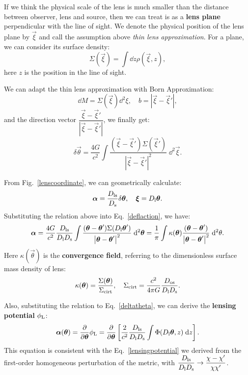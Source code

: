 If we think the physical scale of the lens is much smaller than the distance between observer, lens and source, then we can treat is as a \textbf{lens plane} perpendicular with the line of sight. We denote the physical position of the lens plane by $\vec{\xi}$ and call the assumption above \textit{thin lens approximation}. For a plane, we can consider its surface density:
\begin{equation}
    \Sigma(\vec{\xi}) = \int \dd z \rho(\vec{\xi},z),
\end{equation}
here $z$ is the position in the line of sight.

We can adapt the thin lens approximation with Born Approximation:
\[
    \dd M = \Sigma(\vec{\xi})\dd^2 \xi,\quad b = \left|\vec{\xi}-\vec{\xi}'\right|,
\]
and the direction vector $\dfrac{\vec{\xi}-\vec{\xi}'}{|\vec{\xi}-\vec{\xi}'|}$, we finally get:
\begin{equation}
    \delta \vec{\theta} = \dfrac{4G}{c^2}\int \dfrac{(\vec{\xi}-\vec{\xi}')\Sigma(\vec{\xi}')}{\left|\vec{\xi}-\vec{\xi}'\right|^2}\;\dd ^2 \vec{\xi}.
    \label{deflaction}
\end{equation}

From Fig.~\ref{lenscoordinate}, we can geometrically calculate:
\[
    \vec{\alpha} = \dfrac{D_{\rm ls}}{D_{\rm s}}\delta\vec{\theta},\quad \vec{\xi} = D_{\rm l}\vec{\theta}.
\]
Substituting the relation above into Eq.~\ref{deflaction}, we have:
\begin{equation}
    \vec{\alpha} = \dfrac{4G}{c^2}\dfrac{D_{\rm ls}}{D_{\rm l}D_{\rm s}}\int \dfrac{(\vec{\theta}-\vec{\theta}')\Sigma(D_{\rm l}\vec{\theta}')}{\left|\vec{\theta}-\vec{\theta}'\right|^2}\;\dd ^2 \vec{\theta} = \dfrac{1}{\pi}\int\kappa(\vec{\theta})\dfrac{(\vec{\theta}-\vec{\theta}')}{\left|\vec{\theta}-\vec{\theta}'\right|^2}\;\dd ^2  \theta.
\end{equation}
Here $\kappa(\vec{\theta})$ is the \textbf{convergence field}, referring to the dimensionless surface mass density of lens:
\begin{equation}
    \kappa(\vec{\theta}) = \dfrac{\Sigma(\vec{\theta})}{\Sigma_{\rm cirt}},\quad \Sigma_{\rm cirt} = \dfrac{c^2}{4\pi G}\dfrac{D_{\rm os}}{D_{\rm l}D_{\rm s}}.
\end{equation}

Also, substituting the relation to Eq.~\ref{deltatheta}, we can derive the \textbf{lensing potential} $\phi_{\rm L}$:
\begin{equation}
    \vec{\alpha}(\vec{\theta}) = \dfrac{\pp}{\pp \vec{\theta}} \phi_{\rm L} = \dfrac{\pp}{\pp \vec{\theta}}\left[ \dfrac{2}{c^2}\dfrac{D_{\rm ls}}{D_{\rm l}D_{\rm s}}\int \Phi(D_{\rm l}\vec{\theta},z)\;\dd z\right].
\end{equation}
This equation is consistent with the Eq.~\ref{lensingpotential} we derived from the first-order homogeneous perturbation of the metric, with $\dfrac{D_{\rm ls}}{D_{\rm l}D_{\rm s}}\to \dfrac{\chi-\chi'}{\chi\chi'}$.

